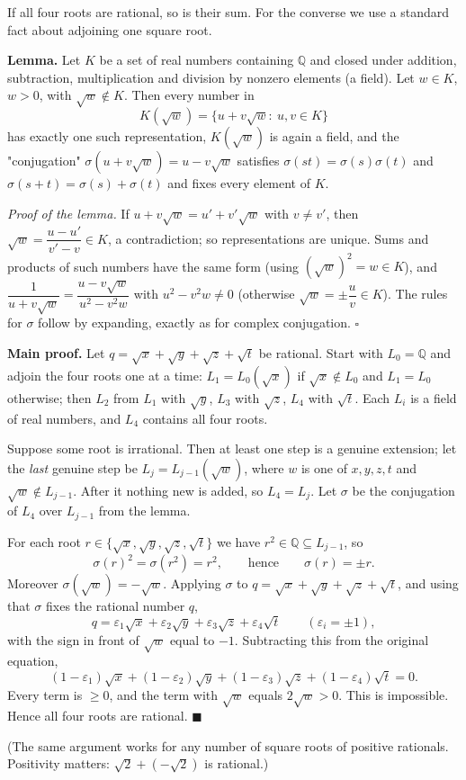 If all four roots are rational, so is their sum. For the converse we use a standard fact about adjoining one square root.

\textbf{Lemma.} Let $K$ be a set of real numbers containing $\mathbb Q$ and closed under addition, subtraction, multiplication and division by nonzero elements (a field). Let $w\in K$, $w>0$, with $\sqrt w\notin K$. Then every number in
\[
K(\sqrt w)=\{u+v\sqrt w:\ u,v\in K\}
\]
has exactly one such representation, $K(\sqrt w)$ is again a field, and the "conjugation" $\sigma(u+v\sqrt w)=u-v\sqrt w$ satisfies $\sigma(st)=\sigma(s)\sigma(t)$ and $\sigma(s+t)=\sigma(s)+\sigma(t)$ and fixes every element of $K$.

\emph{Proof of the lemma.} If $u+v\sqrt w=u'+v'\sqrt w$ with $v\ne v'$, then $\sqrt w=\dfrac{u-u'}{v'-v}\in K$, a contradiction; so representations are unique. Sums and products of such numbers have the same form (using $(\sqrt w)^2=w\in K$), and $\dfrac{1}{u+v\sqrt w}=\dfrac{u-v\sqrt w}{u^2-v^2w}$ with $u^2-v^2w\ne0$ (otherwise $\sqrt w=\pm\dfrac {u}{v}\in K$). The rules for $\sigma$ follow by expanding, exactly as for complex conjugation. $\square$

\textbf{Main proof.} Let $q=\sqrt x+\sqrt y+\sqrt z+\sqrt t$ be rational. Start with $L_0=\mathbb Q$ and adjoin the four roots one at a time: $L_1=L_0(\sqrt x)$ if $\sqrt x\notin L_0$ and $L_1=L_0$ otherwise; then $L_2$ from $L_1$ with $\sqrt y$, $L_3$ with $\sqrt z$, $L_4$ with $\sqrt t$. Each $L_i$ is a field of real numbers, and $L_4$ contains all four roots.

Suppose some root is irrational. Then at least one step is a genuine extension; let the \emph{last} genuine step be $L_j=L_{j-1}(\sqrt w)$, where $w$ is one of $x,y,z,t$ and $\sqrt w\notin L_{j-1}$. After it nothing new is added, so $L_4=L_j$. Let $\sigma$ be the conjugation of $L_4$ over $L_{j-1}$ from the lemma.

For each root $r\in\{\sqrt x,\sqrt y,\sqrt z,\sqrt t\}$ we have $r^2\in\mathbb Q\subseteq L_{j-1}$, so
\[
\sigma(r)^2=\sigma(r^2)=r^2,\qquad\text{hence}\qquad \sigma(r)=\pm r .
\]
Moreover $\sigma(\sqrt w)=-\sqrt w$. Applying $\sigma$ to $q=\sqrt x+\sqrt y+\sqrt z+\sqrt t$, and using that $\sigma$ fixes the rational number $q$,
\[
q=\varepsilon_1\sqrt x+\varepsilon_2\sqrt y+\varepsilon_3\sqrt z+\varepsilon_4\sqrt t\qquad(\varepsilon_i=\pm1),
\]
with the sign in front of $\sqrt w$ equal to $-1$. Subtracting this from the original equation,
\[
(1-\varepsilon_1)\sqrt x+(1-\varepsilon_2)\sqrt y+(1-\varepsilon_3)\sqrt z+(1-\varepsilon_4)\sqrt t=0 .
\]
Every term is $\ge0$, and the term with $\sqrt w$ equals $2\sqrt w>0$. This is impossible. Hence all four roots are rational. $\blacksquare$

(The same argument works for any number of square roots of positive rationals. Positivity matters: $\sqrt2+(-\sqrt2)$ is rational.)
